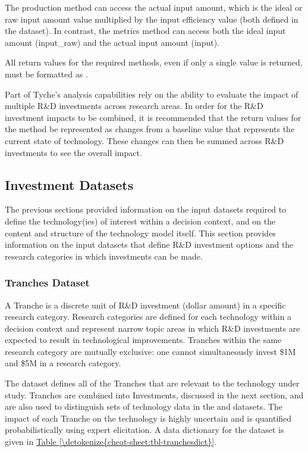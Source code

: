\documentclass[letterpaper,10pt,english]{sphinxmanual}
\begin{document}
\sphinxAtStartPar
The production method can access the actual input amount, which is the ideal or raw input amount value multiplied by the input efficiency value (both defined in the  dataset). In contrast, the metrics method can access both the ideal input amount (input\_raw) and the actual input amount (input).

\sphinxAtStartPar
All return values for the required methods, even if only a single value is returned, must be formatted as .

\sphinxAtStartPar
Part of Tyche’s analysis capabilities rely on the ability to evaluate the impact of multiple R\&D investments across research areas. In order for the R\&D investment impacts to be combined, it is recommended that the return values for the  method be represented as changes from a baseline value that represents the current state of technology. These changes can then be summed across R\&D investments to see the overall impact.


\subsection{Investment Datasets}
\label{\detokenize{cheat-sheet:investment-datasets}}
\sphinxAtStartPar
The previous sections provided information on the input datasets required to define the technology(ies) of interest within a decision context, and on the content and structure of the technology model itself. This section provides information on the input datasets that define R\&D investment options and the research categories in which investments can be made.


\subsubsection{Tranches Dataset}
\label{\detokenize{cheat-sheet:tranches-dataset}}
\sphinxAtStartPar
A Tranche is a discrete unit of R\&D investment (dollar amount) in a specific research category. Research categories are defined for each technology within a decision context and represent narrow topic areas in which R\&D investments are expected to result in technological improvements. Tranches within the same research category are mutually exclusive: one cannot simultaneously invest \$1M and \$5M in a research category.

\sphinxAtStartPar
The  dataset defines all of the Tranches that are relevant to the technology under study. Tranches are combined into Investments, discussed in the next section, and are also used to distinguish sets of technology data in the  and  datasets. The impact of each Tranche on the technology is highly uncertain and is quantified probabilistically using expert elicitation. A data dictionary for the  dataset is given in \hyperref[\detokenize{cheat-sheet:tbl-tranchesdict}]{Table \ref{\detokenize{cheat-sheet:tbl-tranchesdict}}}.
\end{document}
